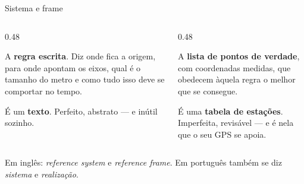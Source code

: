 \documentclass[aspectratio=169,11pt]{beamer}
\newcommand{\bnum}[1]{\textbf{\textcolor{mTeal}{#1}}}
\begin{document}
\begin{frame}{Sistema e frame}
  \begin{columns}[T]
    \begin{column}{0.48\textwidth}
      \begin{regra}[title={Sistema --- \emph{idealizado}}]
        A \bnum{regra escrita}. Diz onde fica a origem, para onde apontam os eixos, qual é o
        tamanho do metro e como tudo isso deve se comportar no tempo.
        \medskip

        É um \textbf{texto}. Perfeito, abstrato --- e \alert{inútil sozinho}.
      \end{regra}
    \end{column}
    \begin{column}{0.48\textwidth}
      \begin{ideia}[title={Frame --- \emph{materializado}}]
        A \bnum{lista de pontos de verdade}, com coordenadas medidas, que obedecem àquela
        regra o melhor que se consegue.
        \medskip

        É uma \textbf{tabela de estações}. Imperfeita, revisável --- e é nela que o seu GPS
        se apoia.
      \end{ideia}
    \end{column}
  \end{columns}
  \bigskip
  \centering
  {\small Em inglês: \emph{reference system} e \emph{reference frame}. Em português também
  se diz \emph{sistema} e \emph{realização}.}
\end{frame}
\end{document}
